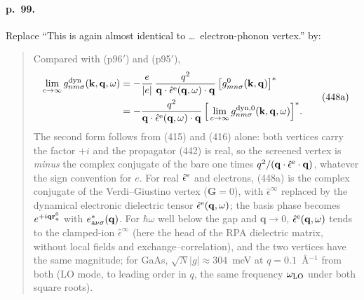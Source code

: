 \documentclass[11pt]{article}
\begin{document}
\paragraph{p.~99.} Replace ``This is again almost identical to \ldots\ electron-phonon vertex.'' by:
\begin{quote}
Compared with (p96$'$) and (p95$'$),
\begin{equation*}
\begin{aligned}
\lim_{c\to\infty}g^{\rm dyn}_{nm\sigma}(\mathbf k,\mathbf q,\omega)
&=-\frac{e}{|e|}\,\frac{q^2}{\mathbf q\cdot\hat\epsilon^{\rm e}(\mathbf q,\omega)\cdot\mathbf q}\,
\big[g^0_{mn\sigma}(\mathbf k,\mathbf q)\big]^*\\
&=-\frac{q^2}{\mathbf q\cdot\hat\epsilon^{\rm e}(\mathbf q,\omega)\cdot\mathbf q}\,
\Big[\lim_{c\to\infty}g^{\rm dyn,0}_{nm\sigma}(\mathbf k,\mathbf q,\omega)\Big]^* .
\end{aligned}
\tag{448a}
\end{equation*}
The second form follows from (415) and (416) alone: both vertices carry the factor $+i$ and the
propagator (442) is real, so the screened vertex is \emph{minus} the complex conjugate of the bare one
times $q^2/(\mathbf q\cdot\hat\epsilon^{\rm e}\cdot\mathbf q)$, whatever the sign convention for $e$. For real
$\hat\epsilon^{\rm e}$ and electrons, (448a) is the complex conjugate of the Verdi--Giustino vertex
($\mathbf G=0$), with $\hat\epsilon^\infty$ replaced by the dynamical electronic dielectric tensor
$\hat\epsilon^{\rm e}(\mathbf q,\omega)$; the basis phase becomes $e^{+i\mathbf q\mathbf r^0_{\rm a}}$ with
$e^*_{{\rm a}\nu\sigma}(\mathbf q)$. For $\hbar\omega$ well below the gap and $\mathbf q\to0$,
$\hat\epsilon^{\rm e}(\mathbf q,\omega)$ tends to the clamped-ion $\hat\epsilon^\infty$ (here the head of the
RPA dielectric matrix, without local fields and exchange--correlation), and the two vertices have the
same magnitude; for GaAs, $\sqrt N|g|\approx304$~meV at $q=0.1$~\AA$^{-1}$ from both (LO mode, to leading
order in $q$, the same frequency $\omega_{\rm LO}$ under both square roots).
\end{quote}
\end{document}
